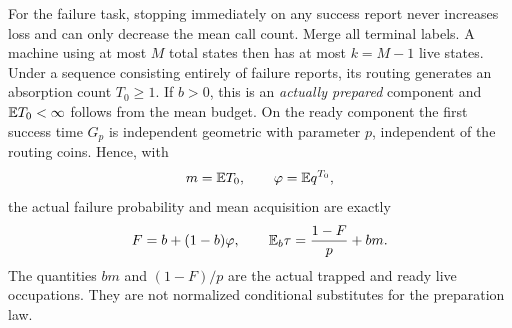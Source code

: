 For the failure task, stopping immediately on any success report never increases loss and can only decrease the mean call count. Merge all terminal labels. A machine using at most $M$ total states then has at most $k=M-1$ live states. Under a sequence consisting entirely of failure reports, its routing generates an absorption count $T_0\ge1$. If $b>0$, this is an \emph{actually prepared} component and $\mathbb E T_0<\infty$ follows from the mean budget. On the ready component the first success time $G_p$ is independent geometric with parameter $p$, independent of the routing coins. Hence, with
\[
 m=\mathbb E T_0,\qquad \varphi=\mathbb E q^{T_0},
\]
the actual failure probability and mean acquisition are exactly
\begin{equation}\label{eq:rare-flow}
 F=b+(1-b)\varphi,\qquad
 \mathbb E_b\tau=\frac{1-F}{p}+bm.
\end{equation}
The quantities $bm$ and $(1-F)/p$ are the actual trapped and ready live occupations. They are not normalized conditional substitutes for the preparation law.

